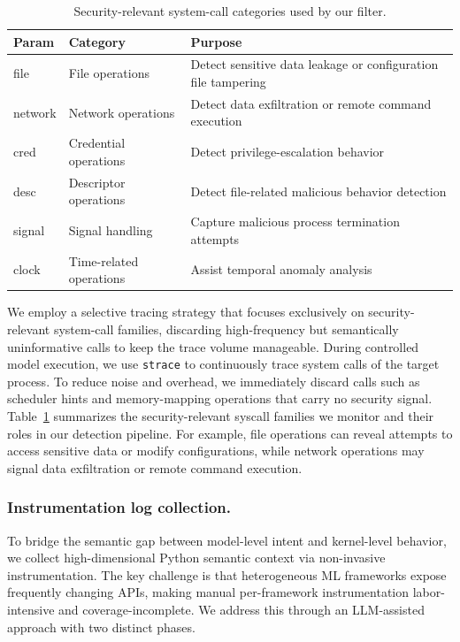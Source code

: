 \begin{table}[t!]
	\centering
	\caption{Security-relevant system-call categories used by our filter.}
	\begin{tabular}{p{} p{} p{}}
		\hline
		Param & Category & Purpose \\
		\hline
		file   & File operations  & Detect sensitive data leakage or configuration file tampering \\
		network & Network operations  & Detect data exfiltration or remote command execution \\
		cred   & Credential operations  & Detect privilege-escalation behavior \\
		desc   & Descriptor operations  & Detect file-related malicious behavior detection \\
		signal & Signal handling  & Capture malicious process termination attempts \\
		clock  & Time-related operations & Assist temporal anomaly analysis  \\
		\hline
	\end{tabular}
	\label{tab:syscalltypes}
\end{table}

We employ a selective tracing strategy that focuses exclusively on security-relevant system-call families, discarding high-frequency but semantically uninformative calls to keep the trace volume manageable. During controlled model execution, we use \texttt{strace} to continuously trace system calls of the target process. To reduce noise and overhead, we immediately discard calls such as scheduler hints and memory-mapping operations that carry no security signal\cite{shakya2022analysisdetectionclassificationandroid}. Table~\ref{tab:syscalltypes} summarizes the security-relevant syscall families we monitor and their roles in our detection pipeline. For example, file operations can reveal attempts to access sensitive data or modify configurations, while network operations may signal data exfiltration or remote command execution.

\subsubsection{Instrumentation log collection.}
To bridge the semantic gap between model-level intent and kernel-level behavior, we collect high-dimensional Python semantic context via non-invasive instrumentation. The key challenge is that heterogeneous ML frameworks expose frequently changing APIs, making manual per-framework instrumentation labor-intensive and coverage-incomplete. We address this through an LLM-assisted approach with two distinct phases.

